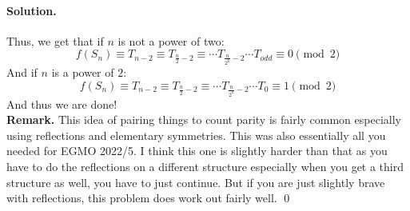 \documentclass[12pt]{article}
\newenvironment{solution}
{\paragraph{Solution.}}
{\qed\eject}
\begin{document}
\begin{solution}
    Thus, we get that if $n$ is not a power of two: \[f(S_n)\equiv T_{n-2}\equiv T_{\frac{n}{2}-2}\equiv \cdots T_{\frac{n}{2^k}-2} \cdots T_{odd}\equiv 0 \pmod{2}\]
    And if $n$ is a power of $2$: \[f(S_n)\equiv T_{n-2}\equiv T_{\frac{n}{2}-2}\equiv \cdots T_{\frac{n}{2^k}-2} \cdots T_{0}\equiv 1 \pmod{2}\]
    And thus we are done!\\

    \textbf{Remark.} This idea of pairing things to count parity is fairly common especially using reflections and elementary symmetries. This was also essentially all you needed for EGMO 2022/5. I think this one is slightly harder than that as you have to do the reflections on a different structure especially when you get a third structure as well, you have to just continue. But if you are just slightly brave with reflections, this problem does work out fairly well.
\end{solution}
\end{document}
